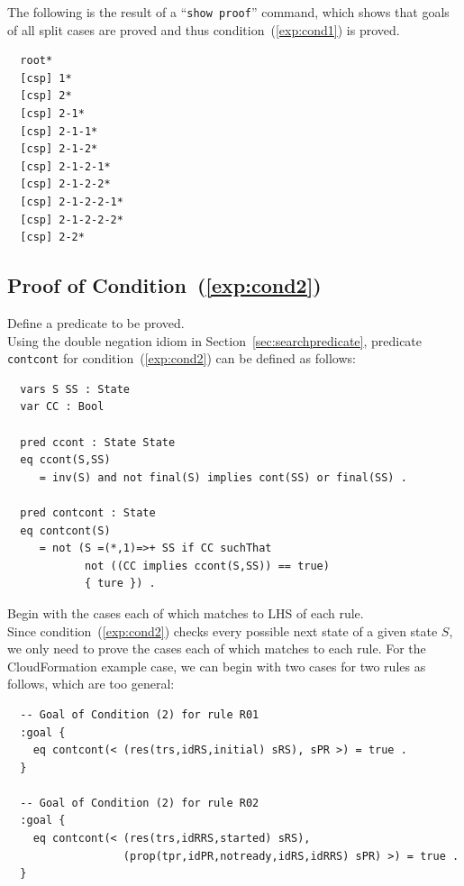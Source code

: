 \documentclass[12pt]{report}
\newcommand{\stt}[1]{{\small{\tt {#1}}}}
\begin{document}
The following is the result of a ``\stt{show proof}'' command, which shows
that goals of all split cases are proved and thus
condition~(\ref{exp:cond1}) is proved.
\small
\begin{verbatim}
  root*
  [csp] 1*
  [csp] 2*
  [csp] 2-1*
  [csp] 2-1-1*
  [csp] 2-1-2*
  [csp] 2-1-2-1*
  [csp] 2-1-2-2*
  [csp] 2-1-2-2-1*
  [csp] 2-1-2-2-2*
  [csp] 2-2*
\end{verbatim}
\normalsize

\subsection{Proof of Condition~(\ref{exp:cond2})}
\label{sec:TOSCAcontcont}
 Define a predicate to be proved. \\ Using the
double negation idiom in Section~\ref{sec:searchpredicate}, predicate
{\tt contcont} for condition~(\ref{exp:cond2}) can be defined as follows:
\small
\begin{verbatim}
  vars S SS : State
  var CC : Bool

  pred ccont : State State
  eq ccont(S,SS)
     = inv(S) and not final(S) implies cont(SS) or final(SS) .

  pred contcont : State
  eq contcont(S)
     = not (S =(*,1)=>+ SS if CC suchThat
            not ((CC implies ccont(S,SS)) == true)
            { ture }) .
\end{verbatim}
\normalsize

 Begin with the cases each of which matches to
LHS of each rule. \\ Since condition~(\ref{exp:cond2}) checks every
possible next state of a given state $S$, we only need to prove the
cases each of which matches to each rule. For the CloudFormation
example case, we can begin with two cases for two rules as follows,
which are too general:
\small
\begin{verbatim}
  -- Goal of Condition (2) for rule R01
  :goal {
    eq contcont(< (res(trs,idRS,initial) sRS), sPR >) = true .
  }

  -- Goal of Condition (2) for rule R02
  :goal {
    eq contcont(< (res(trs,idRRS,started) sRS),
                  (prop(tpr,idPR,notready,idRS,idRRS) sPR) >) = true .
  }
\end{verbatim}
\normalsize
\end{document}
